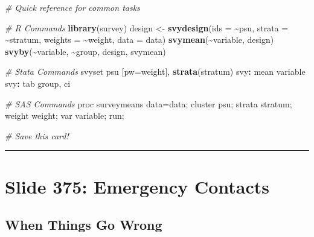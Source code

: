 \documentclass[
]{article}
\newenvironment{Shaded}{\begin{snugshade}}{\end{snugshade}}
\newcommand{\AttributeTok}[1]{\textcolor[rgb]{0.13,0.29,0.53}{#1}}
\newcommand{\CommentTok}[1]{\textcolor[rgb]{0.56,0.35,0.01}{\textit{#1}}}
\newcommand{\FunctionTok}[1]{\textcolor[rgb]{0.13,0.29,0.53}{\textbf{#1}}}
\newcommand{\NormalTok}[1]{#1}
\newcommand{\OtherTok}[1]{\textcolor[rgb]{0.56,0.35,0.01}{#1}}
\newcommand{\SpecialCharTok}[1]{\textcolor[rgb]{0.81,0.36,0.00}{\textbf{#1}}}
\begin{document}
\begin{Shaded}
\begin{Highlighting}[]
\CommentTok{\# Quick reference for common tasks}

\CommentTok{\# R Commands}
\FunctionTok{library}\NormalTok{(survey)}
\NormalTok{design }\OtherTok{\textless{}{-}} \FunctionTok{svydesign}\NormalTok{(}\AttributeTok{ids =} \SpecialCharTok{\textasciitilde{}}\NormalTok{psu, }\AttributeTok{strata =} \SpecialCharTok{\textasciitilde{}}\NormalTok{stratum, }
                   \AttributeTok{weights =} \SpecialCharTok{\textasciitilde{}}\NormalTok{weight, }\AttributeTok{data =}\NormalTok{ data)}
\FunctionTok{svymean}\NormalTok{(}\SpecialCharTok{\textasciitilde{}}\NormalTok{variable, design)}
\FunctionTok{svyby}\NormalTok{(}\SpecialCharTok{\textasciitilde{}}\NormalTok{variable, }\SpecialCharTok{\textasciitilde{}}\NormalTok{group, design, svymean)}

\CommentTok{\# Stata Commands}
\NormalTok{svyset psu [pw}\OtherTok{=}\NormalTok{weight], }\FunctionTok{strata}\NormalTok{(stratum)}
\NormalTok{svy}\SpecialCharTok{:}\NormalTok{ mean variable}
\NormalTok{svy}\SpecialCharTok{:}\NormalTok{ tab group, ci}

\CommentTok{\# SAS Commands}
\NormalTok{proc surveymeans data}\OtherTok{=}\NormalTok{data;}
\NormalTok{  cluster psu;}
\NormalTok{  strata stratum;}
\NormalTok{  weight weight;}
\NormalTok{  var variable;}
\NormalTok{run;}

\CommentTok{\# Save this card!}
\end{Highlighting}
\end{Shaded}

\begin{center}\rule{0.5\linewidth}{0.5pt}\end{center}

\section{Slide 375: Emergency
Contacts}\label{slide-375-emergency-contacts}

\subsection{When Things Go Wrong}\label{when-things-go-wrong}
\end{document}
